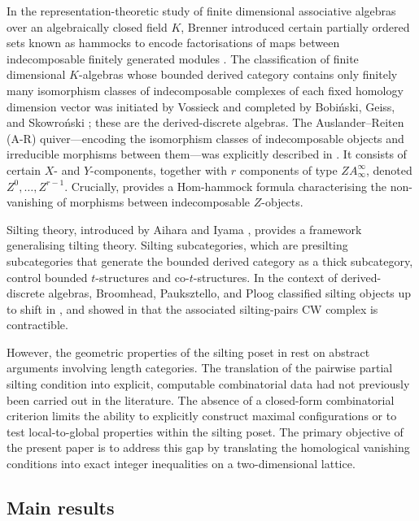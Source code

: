 \documentclass[11pt, a4paper]{article}
\theoremstyle{definition}
\def\ss{ss}%
\def\mathbb#1{#1}%
\def\mathcal#1{#1}%
\begin{document}
In the representation-theoretic study of finite dimensional associative algebras over an algebraically closed field $K$, Brenner introduced certain partially ordered sets known as hammocks to encode factorisations of maps between indecomposable finitely generated modules \cite{Brenner1986}. The classification of finite dimensional $K$-algebras whose bounded derived category contains only finitely many isomorphism classes of indecomposable complexes of each fixed homology dimension vector was initiated by Vossieck \cite{Vossieck2001} and completed by Bobi\'nski, Gei\ss{}, and Skowro\'nski \cite{BGS2004}; these are the derived-discrete algebras. The Auslander--Reiten (A-R) quiver---encoding the isomorphism classes of indecomposable objects and irreducible morphisms between them---was explicitly described in \cite{BGS2004}. It consists of certain $\mathcal{X}$- and $\mathcal{Y}$-components, together with $r$ components of type $\mathbb{Z}A_\infty^\infty$, denoted $\mathcal{Z}^0, \dots, \mathcal{Z}^{r-1}$. Crucially, \cite{BGS2004} provides a Hom-hammock formula characterising the non-vanishing of morphisms between indecomposable $\mathcal{Z}$-objects.

Silting theory, introduced by Aihara and Iyama \cite{AI2012}, provides a framework generalising tilting theory. Silting subcategories, which are presilting subcategories that generate the bounded derived category as a thick subcategory, control bounded $t$-structures and co-$t$-structures. In the context of derived-discrete algebras, Broomhead, Pauksztello, and Ploog classified silting objects up to shift in \cite{BPP2017}, and showed in \cite{BPP2016} that the associated silting-pairs CW complex is contractible.

However, the geometric properties of the silting poset in \cite{BPP2016, BPP2017} rest on abstract arguments involving length categories. The translation of the pairwise partial silting condition into explicit, computable combinatorial data had not previously been carried out in the literature. The absence of a closed-form combinatorial criterion limits the ability to explicitly construct maximal configurations or to test local-to-global properties within the silting poset. The primary objective of the present paper is to address this gap by translating the homological vanishing conditions into exact integer inequalities on a two-dimensional lattice.

\subsection{Main results}
\label{subsec:intro-main}
\end{document}
